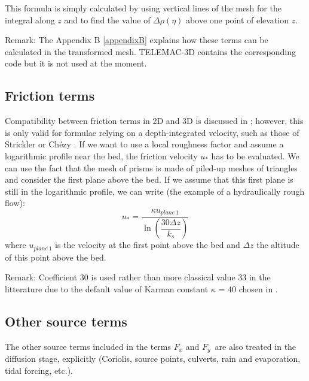 This formula is simply calculated by using vertical lines of the mesh for the
integral along $z$ and to find the value of $\Delta\rho(\eta)$ above one point
of elevation $z$.

\begin{CommentBlock}{Remark:}
The Appendix B \ref{appendixB}
explains how these terms can be calculated in
the transformed mesh. TELEMAC-3D contains the corresponding code but it is not
used at the moment.
\end{CommentBlock}

\subsection{\label{friction3D}Friction terms%
%
}
Compatibility between friction terms in 2D and 3D is discussed in
\cite{hervouet007}; however, this is only valid for formulae relying on a
depth-integrated velocity, such as those of Strickler%
or Ch\'{e}zy%
%
. If we want to use a local roughness factor and assume a logarithmic profile
near the bed, the friction velocity $u_{\ast}$ has to be evaluated. We can
use the fact that the mesh of prisms is made of piled-up meshes of triangles
and consider the first plane above the bed. If we assume that this first
plane is still in the logarithmic profile, we can write (the example of a
hydraulically rough flow):%
%
%
\begin{equation}
u_*=\dfrac{\kappa u_{plane\,1}}{\ln\left(\dfrac{30\Delta z}{k_{s}}\right)}%
\end{equation}
where $u_{plane\,1}$ is the velocity at the first point above the bed and
$\Delta z$ the altitude of this point above the bed.

\begin{CommentBlock}{Remark:}
Coefficient 30 is used rather than more classical value 33 in the litterature
due to the default value of Karman constant $\kappa$ = 40 chosen in
.
\end{CommentBlock}

\subsection{\label{calcul termes sources 3D}Other source terms}

The other source terms included in the terms $F_{x}$ and $F_{y}$\ are also
treated in the diffusion stage, explicitly (Coriolis, source points, culverts,
rain and evaporation, tidal forcing, etc.).

